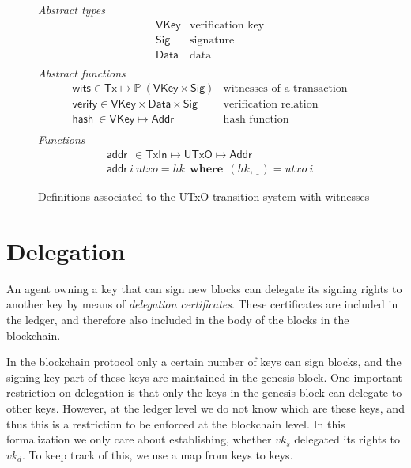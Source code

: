 \documentclass[11pt,a4paper]{article}
\newcommand{\powerset}[1]{\mathbb{P}~#1}
\newcommand{\var}[1]{\mathit{#1}}
\newcommand{\fun}[1]{\mathsf{#1}}
\newcommand{\type}[1]{\mathsf{#1}}
\newcommand{\where}{~ ~ \mathbf{where}~ ~ }
\newcommand{\Tx}{\type{Tx}}
\newcommand{\Addr}{\type{Addr}}
\newcommand{\UTxO}{\type{UTxO}}
\newcommand{\TxIn}{\type{TxIn}}
\newcommand{\VKey}{\type{VKey}}
\newcommand{\Sig}{\type{Sig}}
\newcommand{\Data}{\type{Data}}
\newcommand{\addr}[2]{\fun{addr}~ \var{#1}~ \var{#2}}
\newcommand{\hash}[1]{\fun{hash}~ \var{#1}}
\newcommand{\wcard}[0]{\underline{\phantom{a}}}
\begin{document}
\begin{figure}
  \emph{Abstract types}
  \begin{align*}
    & \VKey & \text{verification key}\\
    & \Sig  & \text{signature}\\
    & \Data  & \text{data}\\
  \end{align*}
  \emph{Abstract functions}
  \begin{align*}
    & \fun{wits} \in \Tx \mapsto \powerset{(\VKey \times \Sig)}
    & \text{witnesses of a transaction}\\
    & \fun{verify} \in \VKey \times \Data \times \Sig
    & \text{verification relation}\\
    & \hash{} \in \VKey \mapsto \Addr
    & \text{hash function} \\
  \end{align*}
  \emph{Functions}
  \begin{align*}
    & \addr{}{} \in \TxIn \mapsto \UTxO \mapsto \Addr\\
    & \addr{i}{utxo} = \var{hk} \where (hk, \wcard) = \var{utxo}~i
  \end{align*}
  \caption{Definitions associated to the UTxO transition system with witnesses}
  \label{fig:state-trans-utxo-witnesses-defs}
\end{figure}

\section{Delegation}
\label{sec:delegation}

An agent owning a key that can sign new blocks can delegate its signing rights
to another key by means of \textit{delegation certificates}. These certificates
are included in the ledger, and therefore also included in the body of the
blocks in the blockchain.

In the blockchain protocol only a certain number of keys can sign blocks, and
the signing key part of these keys are maintained in the genesis block. One
important restriction on delegation is that only the keys in the genesis
block can delegate to other keys. However, at the ledger level we do not know
which are these keys, and thus this is a restriction to be enforced at the
blockchain level. In this formalization we only care about establishing,
whether $\var{vk}_s$ delegated its rights to $\var{vk}_d$. To keep track of
this, we use a map from keys to keys.
\end{document}
